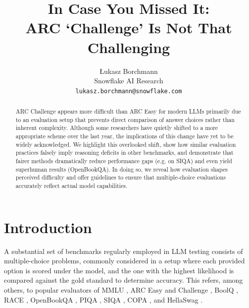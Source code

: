 \documentclass[11pt]{article}
\title{In Case You Missed It:\\ARC `Challenge' Is Not That Challenging}
\author{Łukasz Borchmann \\
  Snowflake AI Research \\
  \texttt{lukasz.borchmann@snowflake.com}}
\begin{document}
\maketitle

\begin{abstract}
ARC Challenge appears more difficult than ARC Easy for modern LLMs primarily due to an evaluation setup that prevents direct comparison of answer choices rather than inherent complexity. Although some researchers have quietly shifted to a more appropriate scheme over the last year, the implications of this change have yet to be widely acknowledged. We highlight this overlooked shift, show how similar evaluation practices falsely imply reasoning deficits in other benchmarks, and demonstrate that fairer methods dramatically reduce performance gaps (e.g. on SIQA) and even yield superhuman results (OpenBookQA). In doing so, we reveal how evaluation shapes perceived difficulty and offer guidelines to ensure that multiple-choice evaluations accurately reflect actual model capabilities.
\end{abstract}

\section{Introduction}

A substantial set of benchmarks regularly employed in LLM testing consists of multiple-choice problems, commonly considered in a setup where each provided option is scored under the model, and the one with the highest likelihood is compared against the gold standard to determine accuracy. This refers, among others, to popular evaluators of MMLU \cite{hendrycks2021measuringmassivemultitasklanguage}, ARC Easy and Challenge \cite{clark2018thinksolvedquestionanswering}, BoolQ \cite{clark2019boolqexploringsurprisingdifficulty}, RACE \cite{lai2017racelargescalereadingcomprehension}, OpenBookQA \cite{mihaylov2018suitarmorconductelectricity}, PIQA \cite{DBLP:journals/corr/abs-1911-11641}, SIQA \cite{sap2019socialiqacommonsensereasoningsocial}, COPA \cite{Gordon2011ChoiceOP}, and HellaSwag \cite{zellers2019hellaswagmachinereallyfinish}.
\end{document}
